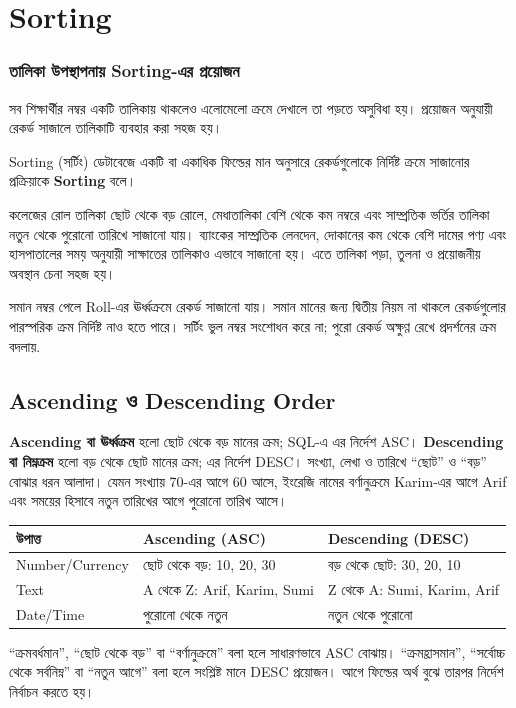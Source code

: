 \section{Sorting}

\subsubsection{তালিকা উপস্থাপনায় Sorting-এর প্রয়োজন}
সব শিক্ষার্থীর নম্বর একটি তালিকায় থাকলেও এলোমেলো ক্রমে দেখালে তা পড়তে অসুবিধা হয়। প্রয়োজন অনুযায়ী রেকর্ড সাজালে তালিকাটি ব্যবহার করা সহজ হয়।



\begin{definitionbox}{Sorting (সর্টিং)}
ডেটাবেজে একটি বা একাধিক ফিল্ডের মান অনুসারে রেকর্ডগুলোকে নির্দিষ্ট ক্রমে সাজানোর প্রক্রিয়াকে \textbf{Sorting} বলে।
\end{definitionbox}
কলেজের রোল তালিকা ছোট থেকে বড় রোলে, মেধাতালিকা বেশি থেকে কম নম্বরে এবং সাম্প্রতিক ভর্তির তালিকা নতুন থেকে পুরোনো তারিখে সাজানো যায়। ব্যাংকের সাম্প্রতিক লেনদেন, দোকানের কম থেকে বেশি দামের পণ্য এবং হাসপাতালের সময় অনুযায়ী সাক্ষাতের তালিকাও এভাবে সাজানো হয়। এতে তালিকা পড়া, তুলনা ও প্রয়োজনীয় অবস্থান চেনা সহজ হয়।

সমান নম্বর পেলে Roll-এর ঊর্ধ্বক্রমে রেকর্ড সাজানো যায়। সমান মানের জন্য দ্বিতীয় নিয়ম না থাকলে রেকর্ডগুলোর পারস্পরিক ক্রম নির্দিষ্ট নাও হতে পারে। সর্টিং ভুল নম্বর সংশোধন করে না; পুরো রেকর্ড অক্ষুণ্ণ রেখে প্রদর্শনের ক্রম বদলায়.

\subsection{Ascending ও Descending Order}
\textbf{Ascending বা ঊর্ধ্বক্রম} হলো ছোট থেকে বড় মানের ক্রম; SQL-এ এর নির্দেশ ASC। \textbf{Descending বা নিম্নক্রম} হলো বড় থেকে ছোট মানের ক্রম; এর নির্দেশ DESC। সংখ্যা, লেখা ও তারিখে ``ছোট'' ও ``বড়'' বোঝার ধরন আলাদা। যেমন সংখ্যায় 70-এর আগে 60 আসে, ইংরেজি নামের বর্ণানুক্রমে Karim-এর আগে Arif এবং সময়ের হিসাবে নতুন তারিখের আগে পুরোনো তারিখ আসে।
\begin{flushleft}\begin{minipage}{\linewidth}\raggedright\small
\begin{tabularx}{\linewidth}{|p{25mm}|X|X|}\hline
উপাত্ত & Ascending (ASC) & Descending (DESC)\\\hline
Number/Currency & ছোট থেকে বড়: 10, 20, 30 & বড় থেকে ছোট: 30, 20, 10\\\hline
Text & A থেকে Z: Arif, Karim, Sumi & Z থেকে A: Sumi, Karim, Arif\\\hline
Date/Time & পুরোনো থেকে নতুন & নতুন থেকে পুরোনো\\\hline
\end{tabularx}
\end{minipage}\end{flushleft}
``ক্রমবর্ধমান'', ``ছোট থেকে বড়'' বা ``বর্ণানুক্রমে'' বলা হলে সাধারণভাবে ASC বোঝায়। ``ক্রমহ্রাসমান'', ``সর্বোচ্চ থেকে সর্বনিম্ন'' বা ``নতুন আগে'' বলা হলে সংশ্লিষ্ট মানে DESC প্রয়োজন। আগে ফিল্ডের অর্থ বুঝে তারপর নির্দেশ নির্বাচন করতে হয়।

